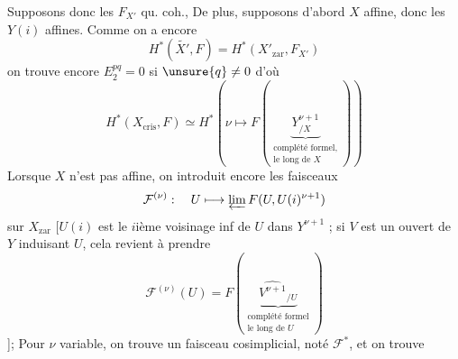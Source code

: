 Supposons donc les $F_{X'}$ qu. coh.,  De plus, supposons d'abord $X$ affine, donc les $Y(i)$ affines.  Comme on a encore
\[
H^*(\widetilde{X'},F)=H^*(X'_{\mathrm{zar}},F_{X'})
\]
on trouve encore $E_2^{pq}=0$ si $\unsure{q}\ne0$ d'où
\[
H^*(X_{\mathrm{cris}},F)\simeq H^*(\nu\longmapsto F(\underbrace{Y^{\nu+1}_{/X}}_{\substack{\text{complété formel,}\\\text{le long de }X}}))
\]
Lorsque $X$ n'est pas affine, on introduit encore les faisceaux
\[
\mathcal F^{(\nu)}:\quad U\longmapsto\varprojlim F(U,U(i)^{\nu+1})
\]
sur $X_{\mathrm{zar}}$ [$U(i)$ est le $i$ième voisinage inf de $U$ dans $Y^{\nu+1}$ ; si $V$ est un ouvert de $Y$ induisant $U$, cela revient à prendre
\[
\mathcal F^{(\nu)}(U)=F(\underbrace{\widehat{V^{\nu+1}}_{/U}}_{\substack{\text{complété formel}\\\text{le long de }U}})
\]
];
Pour $\nu$ variable, on trouve un faisceau cosimplicial,  noté $\mathcal F^*$, et on trouve
